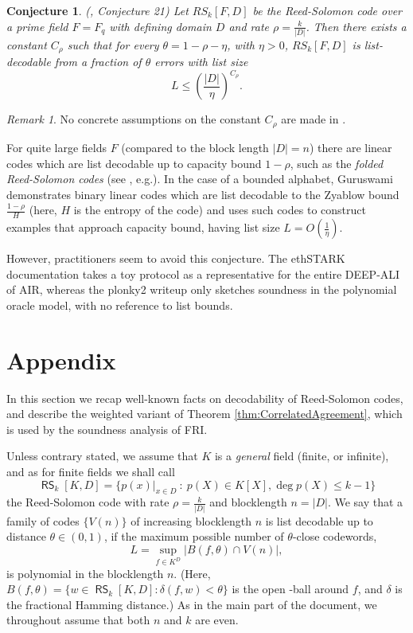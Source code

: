 \documentclass[11pt,article,oneside]{memoir}
\newtheorem{conj}[]{Conjecture}
\theoremstyle{definition}
\theoremstyle{remark}
\newtheorem{rem}[thm]{Remark}
\DeclareMathOperator{\RS}{\mathsf{RS}}
\begin{document}
\begin{conj}
(\cite{DEEPFRI}, Conjecture 21) 
Let $RS_k[F,D]$ be the Reed-Solomon code over a prime field $F=F_q$ with defining domain $D$ and rate $\rho=\frac{k}{|D|}$. 
Then there exists a constant $C_\rho$  such that for every $\theta =1-\rho -\eta$, with $\eta>0$, $RS_k[F,D]$ is list-decodable from a fraction of $\theta$ errors with list size
\[
L \leq\left(\frac{|D|}{\eta}\right)^{C_\rho}.
\]
\end{conj}
\begin{rem}
No concrete assumptions on the constant $C_\rho$ are made in \cite{DEEPFRI}.
\end{rem}

For quite large fields $F$ (compared to the block length $|D|=n$) there are linear codes which are list decodable up to capacity bound $1-\rho$, such as the \textit{folded Reed-Solomon codes} (see \cite{ListDecodingBook}, e.g.). 
In the case of a bounded alphabet, Guruswami \cite{ListDecodingBook} demonstrates binary linear codes which are list decodable to the Zyablow bound $\frac{1-\rho}{H}$ (here, $H$ is the entropy of the code) and uses such codes to construct examples that approach capacity bound, having list size $L=O\left(\frac{1}{\eta}\right)$. 

However, practitioners seem to avoid this conjecture. 
The ethSTARK documentation \cite{ethSTARK} takes a toy protocol as a representative for the entire DEEP-ALI of AIR,  whereas the plonky2 writeup \cite{PolygonZero} only sketches soundness in the polynomial oracle model, with no reference to list bounds.






\appendix
\newpage
\chapter{Appendix}
\label{s:Appendix}

In this section we recap well-known facts on decodability of Reed-Solomon codes\footnotemark, and describe the weighted variant of Theorem \ref{thm:CorrelatedAgreement}, which is used by the soundness analysis of FRI.

Unless contrary stated, we assume that $K$ is a \textit{general} field (finite, or infinite), and as for finite fields we shall call
\[ 
\RS_k[K,D]=\big\{p(x)|_{x\in D} \: :\: p(X)\in K[X], \deg p(X)\leq k-1 \big\}
\]
the Reed-Solomon code with rate $\rho=\frac{k}{|D|}$ and blocklength $n=|D|$. 
We say that a family of codes $\{V(n)\}$ of increasing blocklength $n$ is list decodable up to distance $\theta\in (0,1)$, if the maximum possible number of $\theta$-close codewords,
\[
L = \sup_{f\in K^D} \big| B(f,\theta)\cap V(n) \big|,
\]
is polynomial in the blocklength $n$. 
(Here,  $B(f,\theta)= \{w\in \RS_k[K,D] : \delta(f,w)< \theta\}$
 is the open -ball around $f$, and $\delta$ is the fractional Hamming distance.)   
As in the main part of the document, we throughout assume that both $n$ and $k$ are even.
\end{document}
